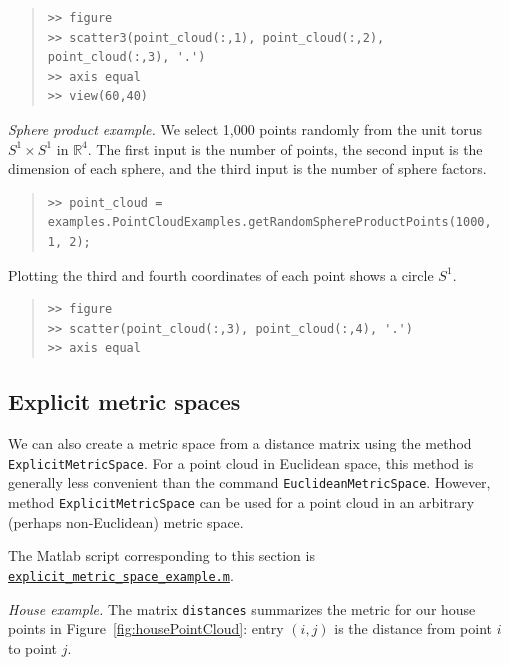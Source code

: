 \documentclass[amscd, amssymb, verbatim]{amsart}[12pt]
\theoremstyle{remark}
\theoremstyle{remark}
\theoremstyle{remark}
\newcommand{\R}{\mathbb{R}}
\begin{document}
\begin{quote} \begin{verbatim}
>> figure
>> scatter3(point_cloud(:,1), point_cloud(:,2), point_cloud(:,3), '.')
>> axis equal
>> view(60,40)
\end{verbatim} \end{quote}

{\em Sphere product example.} We select 1,000 points randomly from the unit torus $S^1 \times S^1$ in $\R^4$. The first input is the number of points, the second input is the dimension of each sphere, and the third input is the number of sphere factors.

\begin{quote} \begin{verbatim}
>> point_cloud = examples.PointCloudExamples.getRandomSphereProductPoints(1000, 1, 2);
\end{verbatim} \end{quote}

Plotting the third and fourth coordinates of each point shows a circle $S^1$.

\begin{quote} \begin{verbatim}
>> figure
>> scatter(point_cloud(:,3), point_cloud(:,4), '.')
>> axis equal
\end{verbatim} \end{quote}


\subsection{Explicit metric spaces}\label{SS:explicit-metric}
We can also create a metric space from a distance matrix using the method \texttt{ExplicitMetricSpace}. For a point cloud in Euclidean space, this method is generally less convenient than the command \texttt{EuclideanMetricSpace}. However, method \texttt{ExplicitMetricSpace} can be used for a point cloud in an arbitrary (perhaps non-Euclidean) metric space. 

The Matlab script corresponding to this section is \href{https://github.com/appliedtopology/javaplex/tree/master/src/matlab/for_distribution/tutorial_examples/explicit_metric_space_example.m}{\texttt{explicit\_metric\_space\_example.m}}. 

{\em House example.} The matrix \texttt{distances} summarizes the metric for our house points in Figure~\ref{fig:housePointCloud}: entry $(i,j)$ is the distance from point $i$ to point $j$. 
\end{document}
